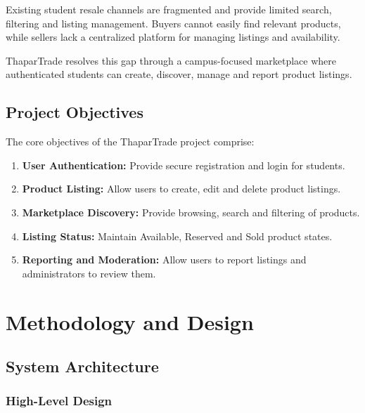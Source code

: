 \documentclass[12pt,a4paper,oneside]{report}
\begin{document}
Existing student resale channels are fragmented and provide limited
search, filtering and listing management. Buyers cannot easily find
relevant products, while sellers lack a centralized platform for
managing listings and availability.

ThaparTrade resolves this gap through a campus-focused marketplace
where authenticated students can create, discover, manage and report
product listings.

\section{Project Objectives}

The core objectives of the ThaparTrade project comprise:

\begin{enumerate}

\item \textbf{User Authentication:}
Provide secure registration and login for students.

\item \textbf{Product Listing:}
Allow users to create, edit and delete product listings.

\item \textbf{Marketplace Discovery:}
Provide browsing, search and filtering of products.

\item \textbf{Listing Status:}
Maintain Available, Reserved and Sold product states.

\item \textbf{Reporting and Moderation:}
Allow users to report listings and administrators to review them.

\end{enumerate}


\chapter{Methodology and Design}

\section{System Architecture}

\subsection{High-Level Design}
\end{document}
